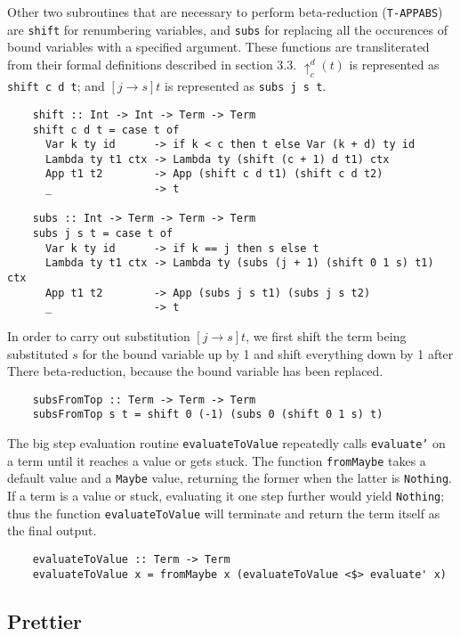 \documentclass[fleqn, 11pt]{article}
\begin{document}
Other two subroutines that are necessary to perform beta-reduction (\texttt{T-APPABS}) are \texttt{shift} for renumbering variables, and 
\texttt{subs} for replacing all the occurences of bound variables with a specified argument. These functions are transliterated from 
their formal definitions described in section 3.3. $\uparrow _c^d(t)$ is represented as \texttt{shift c d t}; and  
$[j \rightarrow s]t$ is represented as \texttt{subs j s t}.

\begin{Verbatim}
    shift :: Int -> Int -> Term -> Term
    shift c d t = case t of 
      Var k ty id      -> if k < c then t else Var (k + d) ty id
      Lambda ty t1 ctx -> Lambda ty (shift (c + 1) d t1) ctx 
      App t1 t2        -> App (shift c d t1) (shift c d t2)
      _                -> t 
      
    subs :: Int -> Term -> Term -> Term 
    subs j s t = case t of 
      Var k ty id      -> if k == j then s else t
      Lambda ty t1 ctx -> Lambda ty (subs (j + 1) (shift 0 1 s) t1) ctx
      App t1 t2        -> App (subs j s t1) (subs j s t2)
      _                -> t 
\end{Verbatim}

In order to carry out substitution $[j \rightarrow s]t$, we first shift the term being substituted $s$ for 
the bound variable up by 1 and shift everything down by 1 after There beta-reduction, because the bound variable has been replaced. 

\begin{Verbatim}
    subsFromTop :: Term -> Term -> Term
    subsFromTop s t = shift 0 (-1) (subs 0 (shift 0 1 s) t)
\end{Verbatim}

The big step evaluation routine \texttt{evaluateToValue} repeatedly calls \texttt{evaluate'} on a term until it reaches a value or gets stuck. 
The function \texttt{fromMaybe} takes a default value and a \texttt{Maybe} value, returning the former when the latter is \texttt{Nothing}. 
If a term is a value or stuck, evaluating it one step further would yield \texttt{Nothing}; thus the function \texttt{evaluateToValue} 
will terminate and return the term itself as the final output. 

\begin{Verbatim}
    evaluateToValue :: Term -> Term
    evaluateToValue x = fromMaybe x (evaluateToValue <$> evaluate' x)
\end{Verbatim}

\subsection{Prettier}
\end{document}
